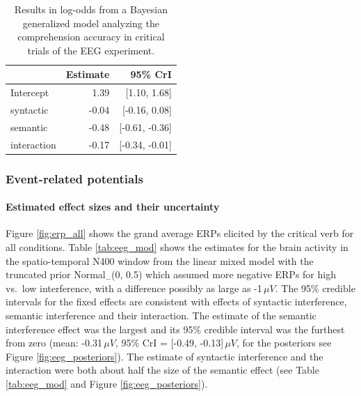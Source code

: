 \documentclass[a4paper, man, floatsintext]{apa7}
\begin{document}
\begin{table}[]
    \caption{Results in log-odds from a Bayesian generalized model analyzing the comprehension accuracy in critical trials of the EEG experiment.}
    \label{tab:eeg_acc_mod}
    \centering
    \begin{tabular}{lrr}
    \toprule
    & Estimate &  95\% CrI  \\
    \midrule
Intercept& 1.39 &   [1.10, 1.68]\\
syntactic& -0.04 &  [-0.16, 0.08]\\
semantic&  -0.48 & [-0.61, -0.36]\\
interaction& -0.17&  [-0.34, -0.01]\\
    \bottomrule
    \end{tabular}
\end{table}

\subsubsection{Event-related potentials}

\paragraph{Estimated effect sizes and their uncertainty}

Figure \ref{fig:erp_all} shows the 
grand average ERPs elicited by the critical verb for all conditions. Table \ref{tab:eeg_mod} shows the estimates for the brain activity in the spatio-temporal N400 window from the linear mixed model with the truncated prior Normal$_-$(0, 0.5) which assumed more negative ERPs for high vs.\ low interference, with a difference possibly as large as -1\,$\mu V$. The 95\% credible intervals for the fixed effects are consistent with effects of syntactic interference, semantic interference and their interaction. The estimate of the semantic interference effect was the largest and its 95\% credible interval was the furthest from zero (mean: -0.31\,$\mu V$, 95\% CrI = [-0.49, -0.13]\,$\mu V$, for the posteriors see Figure \ref{fig:eeg_posteriors}). The estimate of syntactic interference and the interaction were both about half the size of the semantic effect (see Table \ref{tab:eeg_mod} and Figure \ref{fig:eeg_posteriors}).
\end{document}
